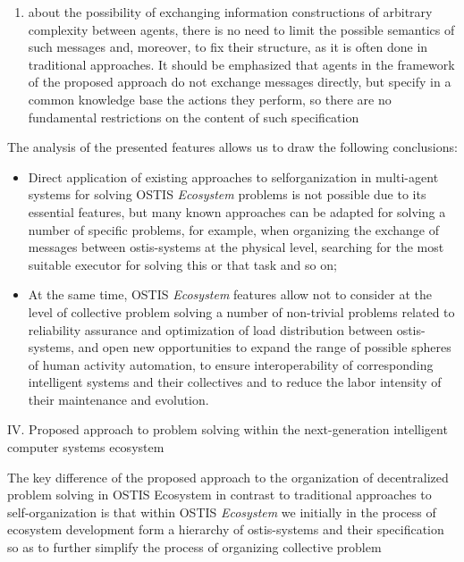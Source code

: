 \documentclass[12pt, a4paper]{article}
\begin{document}
\begin{multicols}{2}
\begin{itemize}
\begin{enumerate}[label=\textbf{--},leftmargin=*]
\item about the possibility of exchanging information
constructions of arbitrary complexity between
agents, there is no need to limit the possible
semantics of such messages and, moreover, to fix
their structure, as it is often done in traditional
approaches. It should be emphasized that agents
in the framework of the proposed approach do not
exchange messages directly, but specify in a common knowledge base the actions they perform,
so there are no fundamental restrictions on the
content of such specification
\end{enumerate}
\end{itemize}\par
The analysis of the presented features allows us to draw
the following conclusions:
\begin{itemize}
\setlength{\itemsep}{0pt}
  \setlength{\parskip}{1pt}
  \setlength{\parsep}{0pt}
\item Direct application of existing approaches to selforganization in multi-agent systems for solving OSTIS \textit {Ecosystem} problems is not possible due to its
essential features, but many known approaches can be adapted for solving a number of specific problems, for example, when organizing the exchange of messages between ostis-systems at the physical level, searching for the most suitable executor for solving this or that task and so on;
\item At the same time, OSTIS \textit {Ecosystem} features allow
not to consider at the level of collective problem
solving a number of non-trivial problems related to
reliability assurance and optimization of load distribution between ostis-systems, and open new opportunities to expand the range of possible spheres of
human activity automation, to ensure interoperability of corresponding intelligent systems and their collectives and to reduce the labor intensity of their maintenance and evolution.
\end{itemize}\par
IV. Proposed approach to problem solving within the
next-generation intelligent computer systems ecosystem\par
The key difference of the proposed approach to the
organization of decentralized problem solving in OSTIS
Ecosystem in contrast to traditional approaches to self-organization is that within OSTIS \textit {Ecosystem} we initially
in the process of ecosystem development form a hierarchy
of ostis-systems and their specification so as to further
simplify the process of organizing collective problem

\end{multicols}
\end{document}

